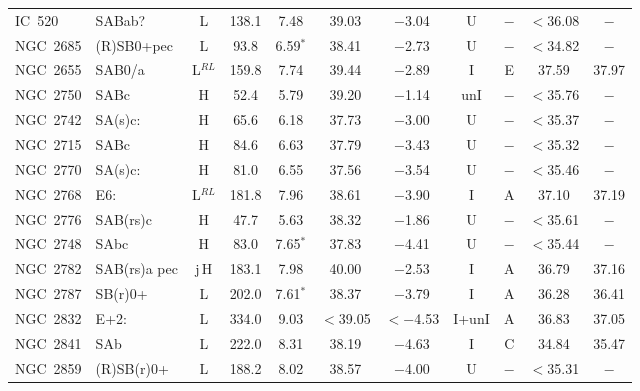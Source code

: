 \begin{center}
\begin{longtable}{lC{2.5cm}ccccccccc}
IC~520 	  & SABab?       &    L        &    138.1    &   7.48      &  39.03    & $-$3.04    &  U &  $-$      & $<$36.08 & $-$   \\
NGC~2685 & (R)SB0+pec  & L               & 93.8  & 6.59$^{*}$      & 38.41    & $-$2.73  & U   &$-$      & $<$34.82  &  $-$          \\
NGC~2655  & SAB0/a       & L$^{RL}$         &    159.8    &  7.74          &   39.44   &  $-$2.89    &  I  & E    &  37.59  &  37.97  \\
NGC~2750 & SABc            & H               & 52.4  & 5.79            & 39.20    & $-$1.14   & unI & $-$      & $<$35.76  &  $-$          \\
NGC~2742 & SA(s)c:         & H               & 65.6  & 6.18            &  37.73    & $-$3.00  &    U   & $-$      & $<$35.37 & $-$        \\
NGC~2715  & SABc           &  H             &  84.6  &  6.63           &  37.79   &  $-$3.43  &   U &  $-$      & $<$35.32 & $-$  \\
NGC~2770 & SA(s)c:         & H               & 81.0    & 6.55            & 37.56    & $-$3.54  &    U   &$-$      & $<$35.46 &   $-$         \\
NGC~2768 & E6:               & L$^{RL}$              & 181.8 & 7.96            & 38.61    & $-$3.90  &      I   & A       & 37.10    & 37.19     \\
NGC~2776 & SAB(rs)c       & H               & 47.7  & 5.63            & 38.32    & $-$1.86   &     U   & $-$      & $<$35.61 &   $-$         \\
NGC~2748  & SAbc           & H            &    83.0     &  7.65$^{*}$   &  37.83  &  $-$4.41   &   U &    $-$      & $<$35.44 & $-$   \\
NGC~2782 & SAB(rs)a pec & j\,H               & 183.1 & 7.98            & 40.00    & $-$2.53   &      I   & A       &  36.79    &   37.16        \\
NGC~2787 & SB(r)0+        & L               & 202.0   & 7.61$^{*}$      & 38.37    & $-$3.79   &     I   & A        & 36.28    & 36.41    \\
NGC~2832 &  E+2:           & L            & 334.0   & 9.03             & $<$39.05  & $<-$4.53  &      I+unI   & A    &  36.83   &  37.05         \\
NGC~2841  & SAb            &  L            &   222.0  &  8.31           & 38.19    &  $-$4.63            &  I  & C   &  34.84  & 35.47 \\
NGC~2859 & (R)SB(r)0+    & L               & 188.2 & 8.02             & 38.57    & $-$4.00  &      U   &$-$       & $<$35.31 &  $-$          \\

\end{longtable}
\end{center}
